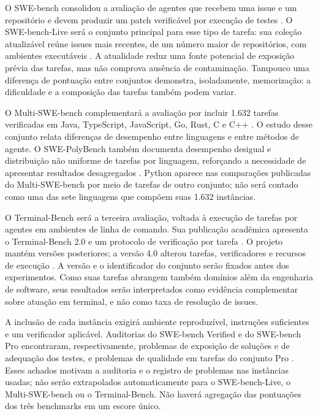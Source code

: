 O SWE-bench consolidou a avaliação de agentes que recebem uma issue e um repositório e devem produzir um patch verificável por execução de testes \cite{Jimenez2024SWEbench}. O SWE-bench-Live será o conjunto principal para esse tipo de tarefa: sua coleção atualizável reúne issues mais recentes, de um número maior de repositórios, com ambientes executáveis \cite{Zhang2025SWEbenchLive}. A atualidade reduz uma fonte potencial de exposição prévia das tarefas, mas não comprova ausência de contaminação. Tampouco uma diferença de pontuação entre conjuntos demonstra, isoladamente, memorização: a dificuldade e a composição das tarefas também podem variar.

O Multi-SWE-bench complementará a avaliação por incluir 1.632 tarefas verificadas em Java, TypeScript, JavaScript, Go, Rust, C e C++ \cite{MultiSWEbench2025}. O estudo desse conjunto relata diferenças de desempenho entre linguagens e entre métodos de agente. O SWE-PolyBench também documenta desempenho desigual e distribuição não uniforme de tarefas por linguagem, reforçando a necessidade de apresentar resultados desagregados \cite{Rashid2025SWEPolyBench}. Python aparece nas comparações publicadas do Multi-SWE-bench por meio de tarefas de outro conjunto; não será contado como uma das sete linguagens que compõem suas 1.632 instâncias.

O Terminal-Bench será a terceira avaliação, voltada à execução de tarefas por agentes em ambientes de linha de comando. Sua publicação acadêmica apresenta o Terminal-Bench 2.0 e um protocolo de verificação por tarefa \cite{Merrill2026TerminalBench}. O projeto mantém versões posteriores; a versão 4.0 alterou tarefas, verificadores e recursos de execução \cite{Marten2026TerminalBench4}. A versão e o identificador do conjunto serão fixados antes dos experimentos. Como suas tarefas abrangem também domínios além da engenharia de software, seus resultados serão interpretados como evidência complementar sobre atuação em terminal, e não como taxa de resolução de issues.

A inclusão de cada instância exigirá ambiente reproduzível, instruções suficientes e um verificador aplicável. Auditorias do SWE-bench Verified e do SWE-bench Pro encontraram, respectivamente, problemas de exposição de soluções e de adequação dos testes, e problemas de qualidade em tarefas do conjunto Pro \cite{OpenAI2026SWEbenchVerified,OpenAI2026SignalNoise}. Esses achados motivam a auditoria e o registro de problemas nas instâncias usadas; não serão extrapolados automaticamente para o SWE-bench-Live, o Multi-SWE-bench ou o Terminal-Bench. Não haverá agregação das pontuações dos três benchmarks em um escore único.


